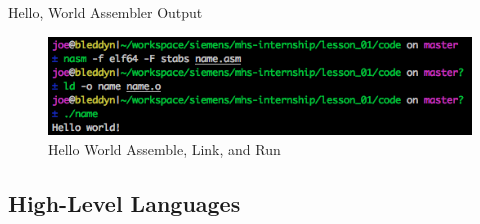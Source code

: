 \documentclass[serif,mathserif,compress]{beamer}
\begin{document}
\begin{frame}[fragile]{Hello, World Assembler Output}
  \begin{figure}
  \centering
  \includegraphics[width=\textwidth]{images/hello-world-asm.png}
  \caption{Hello World Assemble, Link, and Run}
  \label{fig:hello-world-asm-output}
  \end{figure}
\end{frame}

\subsection{High-Level Languages}
\end{document}
